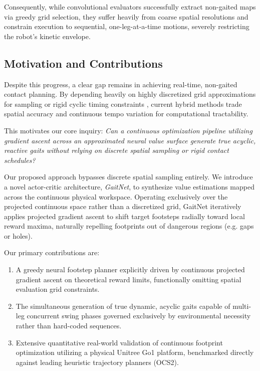 Consequently, while convolutional evaluators
\cite{bratta_contactnet_2024} successfully extract non-gaited maps
via greedy grid selection, they suffer heavily from coarse spatial
resolutions and constrain execution to sequential, one-leg-at-a-time
motions, severely restricting the robot's kinetic envelope.

\subsection{Motivation and Contributions}
Despite this progress, a clear gap remains in achieving real-time,
non-gaited contact planning.
By depending heavily on highly discretized grid approximations for
sampling \cite{bratta_contactnet_2024}
or rigid cyclic timing constraints \cite{Wang2022Oct, Bao2024survey},
current hybrid methods trade spatial
accuracy and continuous tempo variation for computational tractability.

This motivates our core inquiry: \textit{Can a continuous
  optimization pipeline utilizing gradient
  ascent across an approximated neural value surface generate true
  acyclic, reactive gaits without
relying on discrete spatial sampling or rigid contact schedules?}

Our proposed approach bypasses discrete spatial sampling entirely. We
introduce a novel
actor-critic architecture, \textit{GaitNet}, to synthesize value
estimations mapped across the
continuous physical workspace. Operating exclusively over the
projected continuous space rather
than a discretized grid, GaitNet iteratively applies projected
gradient ascent to shift
target footsteps radially toward local reward maxima, naturally
repelling footprints out of
dangerous regions (e.g. gaps or holes).

Our primary contributions are:
\begin{enumerate}
  \item A greedy neural footstep planner explicitly driven by
    continuous projected gradient ascent on theoretical reward
    limits, functionally omitting spatial evaluation grid constraints.
  \item The simultaneous generation of true dynamic, acyclic gaits
    capable of multi-leg concurrent swing phases governed exclusively
    by environmental necessity rather than hard-coded sequences.
  \item Extensive quantitative real-world validation of continuous
    footprint optimization utilizing a physical Unitree Go1 platform,
    benchmarked directly against leading heuristic trajectory planners (OCS2).
\end{enumerate}
